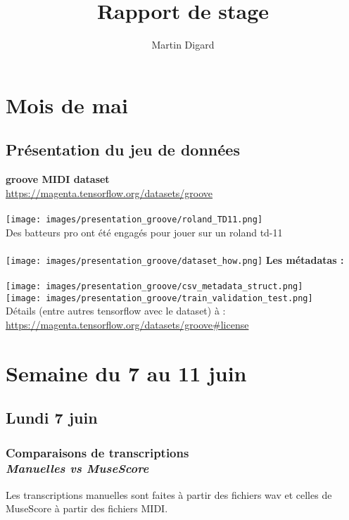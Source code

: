 \documentclass{report}
\begin{document}
	\title{Rapport de stage}
	\author{Martin Digard}
	\date{}
	\maketitle
	\tableofcontents
	\chapter{Mois de mai}
	\section{Présentation du jeu de données}
	\textbf{groove MIDI dataset}\\
	\url{https://magenta.tensorflow.org/datasets/groove}\\\\
	\texttt{[image: images/presentation\_groove/roland\_TD11.png]}\\
	Des batteurs pro ont été engagés pour jouer sur un roland td-11\\\\
	\texttt{[image: images/presentation\_groove/dataset\_how.png]}\newpage{}
	\textbf{Les métadatas :}\\\\
	\texttt{[image: images/presentation\_groove/csv\_metadata\_struct.png]}\\
	\texttt{[image: images/presentation\_groove/train\_validation\_test.png]}\\
	Détails (entre autres tensorflow avec le dataset) à :
	\url{https://magenta.tensorflow.org/datasets/groove#license}\\
	\newpage
	
	
	
	\chapter{Semaine du 7 au 11 juin}
	\section{Lundi 7 juin}
	\subsection{\textbf{Comparaisons de transcriptions}\\\textit{Manuelles vs MuseScore}}
	Les transcriptions manuelles sont faites à partir des fichiers wav et celles de MuseScore à partir des fichiers MIDI.\\
	
\end{document}
